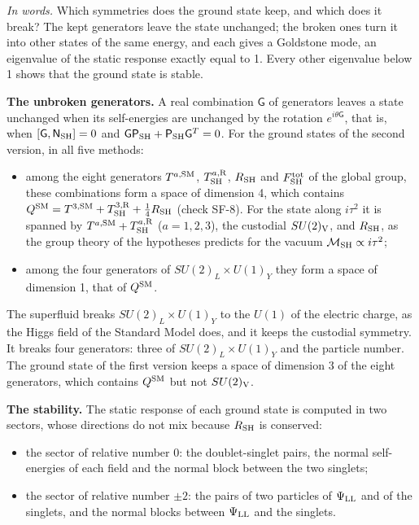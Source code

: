 \documentclass[
  10pt,
]{article}
\providecommand{\tightlist}{%
  \setlength{\itemsep}{0pt}\setlength{\parskip}{0pt}}
\begin{document}
\emph{In words.} Which symmetries does the ground state keep, and which
does it break? The kept generators leave the state unchanged; the broken
ones turn it into other states of the same energy, and each gives a
Goldstone mode, an eigenvalue of the static response exactly equal to 1.
Every other eigenvalue below 1 shows that the ground state is stable.

\textbf{The unbroken generators.} A real combination \(\mathsf G\) of
generators leaves a state unchanged when its self-energies are unchanged
by the rotation \(e^{i\theta\mathsf G}\), that is, when
\([\mathsf G,\mathsf N_{\rm SH}]=0\) and
\(\mathsf G\mathsf P_{\rm SH}+\mathsf P_{\rm SH}\mathsf G^T=0\). For the
ground states of the second version, in all five methods:

\begin{itemize}
\tightlist
\item
  among the eight generators \(T^{a,{\rm SM}}\),
  \(T^{a,{\rm R}}_{\rm SH}\), \(R_{\rm SH}\) and
  \(F^{\rm tot}_{\rm SH}\) of the global group, these combinations form
  a space of dimension 4, which contains
  \(Q^{\rm SM}=T^{3,{\rm SM}}+T^{3,{\rm R}}_{\rm SH}+\tfrac14R_{\rm SH}\)
  (check SF-8). For the state along \(i\tau^2\) it is spanned by
  \(T^{a,{\rm SM}}+T^{a,{\rm R}}_{\rm SH}\) (\(a=1,2,3\)), the custodial
  \(SU(2)_{\rm V}\), and \(R_{\rm SH}\), as the group theory of the
  hypotheses predicts for the vacuum
  \(\mathcal M_{\rm SH}\propto i\tau^2\);
\item
  among the four generators of \(SU(2)_L\times U(1)_Y\) they form a
  space of dimension 1, that of \(Q^{\rm SM}\).
\end{itemize}

The superfluid breaks \(SU(2)_L\times U(1)_Y\) to the \(U(1)\) of the
electric charge, as the Higgs field of the Standard Model does, and it
keeps the custodial symmetry. It breaks four generators: three of
\(SU(2)_L\times U(1)_Y\) and the particle number. The ground state of
the first version keeps a space of dimension 3 of the eight generators,
which contains \(Q^{\rm SM}\) but not \(SU(2)_{\rm V}\).

\textbf{The stability.} The static response of each ground state is
computed in two sectors, whose directions do not mix because
\(R_{\rm SH}\) is conserved:

\begin{itemize}
\tightlist
\item
  the sector of relative number 0: the doublet-singlet pairs, the normal
  self-energies of each field and the normal block between the two
  singlets;
\item
  the sector of relative number \(\pm2\): the pairs of two particles of
  \(\Psi_{\rm LL}\) and of the singlets, and the normal blocks between
  \(\Psi_{\rm LL}\) and the singlets.
\end{itemize}
\end{document}

